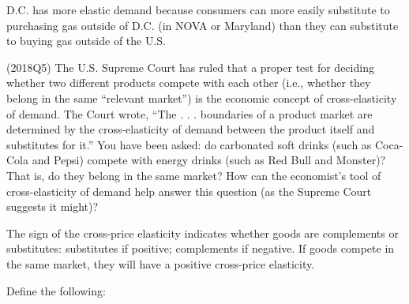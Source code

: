 \documentclass{exam}
\begin{document}
\begin{questions}
\begin{solution}

    D.C. has more elastic demand because consumers can more easily substitute to purchasing gas outside of D.C. (in NOVA or Maryland) than they can substitute to buying gas outside of the U.S. 

\end{solution}

\question (2018Q5) The U.S. Supreme Court has ruled that a proper test for deciding whether two  different products compete with each other (i.e., whether they belong in the same ``relevant market'') is the economic concept of cross-elasticity of demand.  The Court wrote, ``The . . . boundaries of a product market are determined by the cross-elasticity of demand between the product itself and substitutes for it.'' You have been asked: do carbonated soft drinks (such as Coca-Cola and Pepsi) compete with energy drinks (such as Red Bull and Monster)?  That is, do they belong in the same market?  How can the economist’s tool of cross-elasticity of demand help answer this question (as the Supreme Court suggests it might)? 

\begin{solution}
    The sign of the cross-price elasticity indicates whether goods are complements or substitutes: substitutes if positive; complements if negative. If goods compete in the same market, they will have a positive cross-price elasticity.
\end{solution}

\pagebreak

\question Define the following:
\end{questions}
\end{document}
